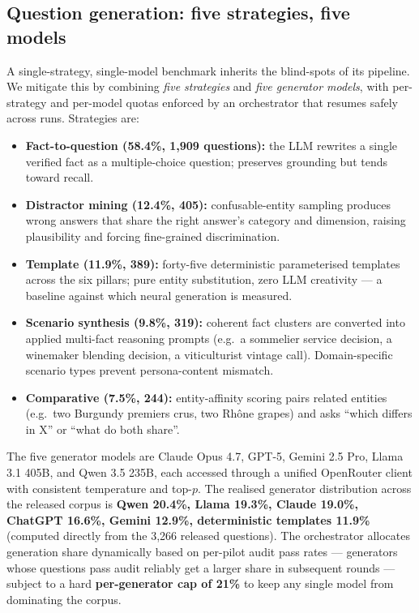 \subsection{Question generation: five strategies, five models}
\label{sec:generation}
A single-strategy, single-model benchmark inherits the blind-spots of
its pipeline. We mitigate this by combining \emph{five strategies} and
\emph{five generator models}, with per-strategy and per-model quotas
enforced by an orchestrator that resumes safely across runs. Strategies
are:
\begin{itemize}\itemsep -1pt
  \item \textbf{Fact-to-question (58.4\%, 1{,}909 questions):} the LLM
    rewrites a single verified fact as a multiple-choice question;
    preserves grounding but tends toward recall.
  \item \textbf{Distractor mining (12.4\%, 405):} confusable-entity
    sampling produces wrong answers that share the right answer's
    category and dimension, raising plausibility and forcing
    fine-grained discrimination.
  \item \textbf{Template (11.9\%, 389):} forty-five deterministic
    parameterised templates across the six pillars; pure entity
    substitution, zero LLM creativity --- a baseline against which
    neural generation is measured.
  \item \textbf{Scenario synthesis (9.8\%, 319):} coherent fact clusters
    are converted into applied multi-fact reasoning prompts (e.g.\ a
    sommelier service decision, a winemaker blending decision, a
    viticulturist vintage call). Domain-specific scenario types prevent
    persona-content mismatch.
  \item \textbf{Comparative (7.5\%, 244):} entity-affinity scoring pairs
    related entities (e.g.\ two Burgundy premiers crus, two Rh\^one
    grapes) and asks ``which differs in X'' or ``what do both share''.
\end{itemize}

The five generator models are Claude Opus 4.7, GPT-5, Gemini 2.5 Pro,
Llama 3.1 405B, and Qwen 3.5 235B, each accessed through a unified
OpenRouter client with consistent temperature and top-$p$. The
realised generator distribution across the released corpus is
\textbf{Qwen 20.4\%, Llama 19.3\%, Claude 19.0\%, ChatGPT 16.6\%,
Gemini 12.9\%, deterministic templates 11.9\%} (computed directly
from the 3{,}266 released questions). The orchestrator allocates
generation share dynamically based on per-pilot audit pass rates ---
generators whose questions pass audit reliably get a larger share in
subsequent rounds --- subject to a hard \textbf{per-generator cap of
21\%} to keep any single model from dominating the corpus.


